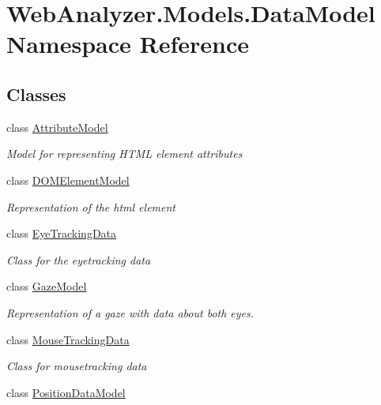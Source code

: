 \hypertarget{namespace_web_analyzer_1_1_models_1_1_data_model}{}\section{Web\+Analyzer.\+Models.\+Data\+Model Namespace Reference}
\label{namespace_web_analyzer_1_1_models_1_1_data_model}
\subsection*{Classes}
\begin{DoxyCompactItemize}
\item 
class \hyperlink{class_web_analyzer_1_1_models_1_1_data_model_1_1_attribute_model}{Attribute\+Model}
\begin{DoxyCompactList}\small\item\em Model for representing H\+T\+M\+L element attributes \end{DoxyCompactList}\item 
class \hyperlink{class_web_analyzer_1_1_models_1_1_data_model_1_1_d_o_m_element_model}{D\+O\+M\+Element\+Model}
\begin{DoxyCompactList}\small\item\em Representation of the html element \end{DoxyCompactList}\item 
class \hyperlink{class_web_analyzer_1_1_models_1_1_data_model_1_1_eye_tracking_data}{Eye\+Tracking\+Data}
\begin{DoxyCompactList}\small\item\em Class for the eyetracking data \end{DoxyCompactList}\item 
class \hyperlink{class_web_analyzer_1_1_models_1_1_data_model_1_1_gaze_model}{Gaze\+Model}
\begin{DoxyCompactList}\small\item\em Representation of a gaze with data about both eyes. \end{DoxyCompactList}\item 
class \hyperlink{class_web_analyzer_1_1_models_1_1_data_model_1_1_mouse_tracking_data}{Mouse\+Tracking\+Data}
\begin{DoxyCompactList}\small\item\em Class for mousetracking data \end{DoxyCompactList}\item 
class \hyperlink{class_web_analyzer_1_1_models_1_1_data_model_1_1_position_data_model}{Position\+Data\+Model}

\end{DoxyCompactItemize}
